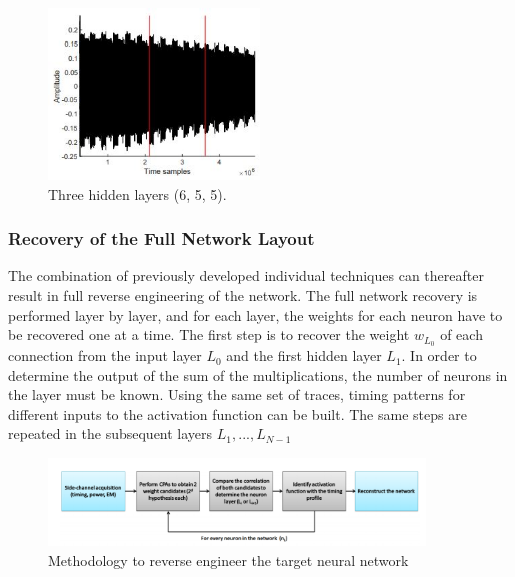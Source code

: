 \begin{figure}
    \centering
    \includegraphics[width=0.5\textwidth]{images/chapter8/layer-c.JPG}
    \caption{Three hidden layers (6, 5, 5).}
    \label{fig:layer-c}
\end{figure}

\subsubsection{Recovery of the Full Network Layout}
The combination of previously developed individual techniques
can thereafter result in full reverse engineering of the network. The full network recovery is performed layer by layer, and for each layer, the weights for each neuron have to be recovered one at a time. The first step is to recover the weight \(w_{L_0}\) of each connection from the input layer \(L_0\) and the first hidden layer \(L_1\). In order to determine the output of the sum of the multiplications, the number of neurons in the layer must be known. Using the same set of traces, timing patterns for different inputs to the activation function can be built. The same steps are repeated in the subsequent layers \(L_1,...,L_{N-1}\)

\begin{figure}
    \centering
    \includegraphics[width=100mm]{images/chapter8/reverse_methodology.PNG}
    \caption{Methodology to reverse engineer the target neural network}
\end{figure}

